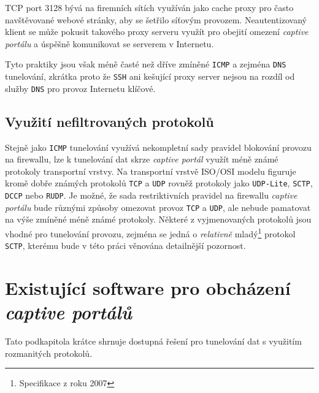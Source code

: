 \documentclass[thesis=M,czech]{FITthesis}[2012/10/20]
\begin{document}
TCP port 3128 bývá na firemních sítích využíván jako cache proxy pro často navštěvované webové stránky, aby se šetřilo síťovým provozem. Neautentizovaný klient se může pokusit takového proxy serveru využít pro obejití omezení \textit{captive portálu} a úspěšně komunikovat se serverem v Internetu.

Tyto praktiky jsou však méně časté než dříve zmíněné \texttt{ICMP} a zejména \texttt{DNS} tunelování, zkrátka proto že \texttt{SSH} ani kešující proxy server nejsou na rozdíl od služby \texttt{DNS} pro provoz Internetu klíčové.



\subsection{Využití nefiltrovaných protokolů}

Stejně jako \texttt{ICMP} tunelování využívá nekompletní sady pravidel blokování provozu na firewallu, lze k tunelování dat skrze \textit{captive portál} využít méně známé protokoly transportní vrstvy. Na transportní vrstvě ISO/OSI modelu figuruje kromě dobře známých protokolů \texttt{TCP} a \texttt{UDP} rovněž protokoly jako \texttt{UDP-Lite}, \texttt{SCTP}, \texttt{DCCP} nebo \texttt{RUDP}. Je možné, že sada restriktivních pravidel na firewallu \textit{captive portálu} bude různými způsoby omezovat provoz \texttt{TCP} a \texttt{UDP}, ale nebude pamatovat na výše zmíněné méně známé protokoly. Některé z vyjmenovaných protokolů jsou vhodné pro tunelování provozu, zejména se jedná o \textit{relativně} mladý\footnote{Specifikace z roku 2007} protokol \texttt{SCTP}, kterému bude v této práci věnována detailnější pozornost.

%

\pagebreak


\section{Existující software pro obcházení \textit{captive portálů}}

Tato podkapitola krátce shrnuje dostupná řešení pro tunelování dat s využitím rozmanitých protokolů.
\end{document}
